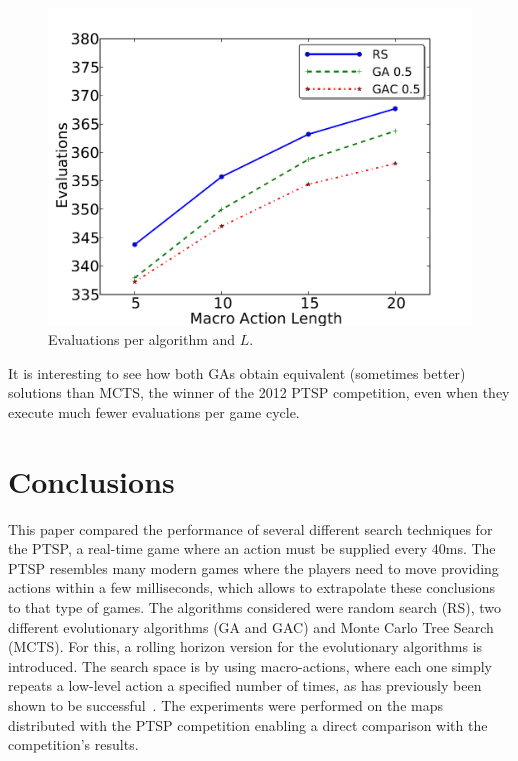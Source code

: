 \documentclass{sig-alternate}
\begin{document}
\begin{figure} [!t]
	\begin{center}
	\includegraphics[width=0.75\columnwidth,natwidth=1025,natheight=768]{img/evaluations.png}
	\caption{Evaluations per algorithm and $L$.}
	\label{fig:evals}
	\end{center}
\end{figure}

It is interesting to see how both GAs obtain equivalent (sometimes better) solutions than MCTS, the winner of the 2012 PTSP competition, even when they execute much fewer evaluations per game cycle.

\section{Conclusions} \label{sec:conc}

This paper compared the performance of several different search techniques for the PTSP, a real-time game where an action must be supplied every $40$ms. The PTSP resembles many modern games where the players need to move providing actions within a few milliseconds, which allows to extrapolate these conclusions to that type of games. The algorithms considered were random search (RS), two different evolutionary algorithms (GA and GAC) and Monte Carlo Tree Search (MCTS). For this, a rolling horizon version for the evolutionary algorithms is introduced. The search space is by using macro-actions, where each one simply repeats a low-level action a specified number of times, as has previously been shown to be successful~\cite{Powley2012}. The experiments were performed on the maps distributed with the PTSP competition enabling a direct comparison with the competition's results.
\end{document}

